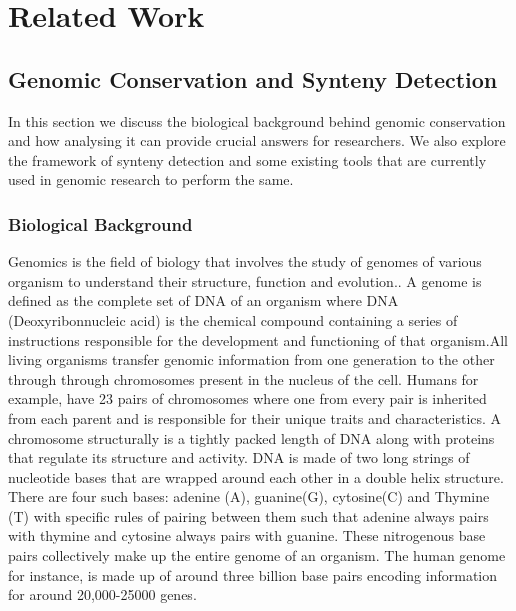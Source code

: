 \chapter{Related Work}

\section{Genomic Conservation and Synteny Detection}
In this section we discuss the biological background behind genomic conservation and how analysing it can provide crucial answers for researchers. We also explore the framework of synteny detection and some existing tools that are currently used in genomic research to perform the same.

\subsection{Biological Background}

Genomics is the field of biology that involves the study of genomes of various organism to understand their structure, function and evolution.\cite{world2002genomics}. A genome is defined as the complete set of DNA of an organism where DNA (Deoxyribonnucleic acid) is the chemical compound containing a series of instructions responsible for the development and functioning of that organism\cite{genomegov}.All living organisms transfer genomic information from one generation to the other through through chromosomes present in the nucleus of the cell. Humans for example, have 23 pairs of chromosomes where one from every pair is inherited from each parent and is responsible for their unique traits and characteristics. A chromosome structurally is a tightly packed length of DNA along with proteins that regulate its structure and activity. DNA is made of two long strings of nucleotide bases that are wrapped around each other in a double helix structure. There are four such bases: adenine (A), guanine(G), cytosine(C) and Thymine (T) with specific rules of pairing between them such that adenine always pairs with thymine and cytosine always pairs with guanine. These nitrogenous base pairs collectively make up the entire genome of an organism\cite{ussery2009computing}. The human genome for instance, is made up of around three billion base pairs encoding information for around 20,000-25000 genes\cite{international2004finishing}. 

